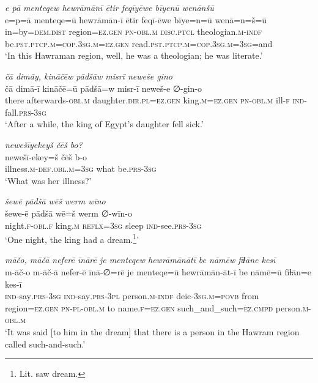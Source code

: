 \ea \label{ZP.23}
\textit{e pā menteqew hewrāmānī ētir feqīyēwe bīyenū wenānšū} \\ 
\gll e=p=ā menteqe=ū hewrāmān-ī ētir feqī-ēwe bīye=n=ū wenā=n=š=ū \\ 
 in=by=\textsc{dem.dist} region\textsc{\textsc{=ez.gen}} \textsc{pn}\textsc{-obl}\textsc{.m} \textsc{disc.ptcl} theologian\textsc{.m}\textsc{-indf} be\textsc{.pst}\textsc{.ptcp}\textsc{.m}\textsc{=cop}\textsc{.3sg}\textsc{.m}\textsc{\textsc{=ez.gen}} read\textsc{.pst}\textsc{.ptcp}\textsc{.m}\textsc{=cop}\textsc{.3sg}\textsc{.m}\textsc{=3sg}=and \\ 
\glt `In this Hawraman region, well, he was a theologian; he was literate.'
\z 
 
\ea \label{ZP.25}
\textit{čā dimāy, kināčēw pādšāw misrī neweše gino} \\ 
\gll čā dimā-ī kināčē=ū pādšā=w misr-ī neweš-e ∅-gin-o \\ 
 there afterwards\textsc{-obl}\textsc{.m} daughter\textsc{.dir}\textsc{.pl}\textsc{\textsc{=ez.gen}} king\textsc{.m}\textsc{\textsc{=ez.gen}} \textsc{pn}\textsc{-obl}\textsc{.m} ill\textsc{-f} \textsc{ind-}fall\textsc{.prs}\textsc{-3sg} \\ 
\glt `After a while, the king of Egypt’s daughter fell sick.'
\z 
 
\ea \label{ZP.27}
\textit{newešīyekeyš čēš bo?} \\ 
\gll newešī-ekey=š čēš b-o \\ 
 illness\textsc{.m}\textsc{-def}\textsc{.obl}\textsc{.m}\textsc{=3sg} what be\textsc{.prs}\textsc{-3sg} \\ 
\glt `What was her illness?'
\z 
 
\ea \label{ZP.30}
\textit{šewē pādšā wēš werm wīno} \\ 
\gll šewe-ē pādšā wē=š werm ∅-wīn-o \\ 
 night\textsc{.f}\textsc{-obl}\textsc{.f} king\textsc{.m} \textsc{reflx}\textsc{=3sg} sleep \textsc{ind-}see\textsc{.prs}\textsc{-3sg} \\ 
\glt `One night, the king had a dream.\footnote{Lit. saw dream.}'
\z 
 
\ea \label{ZP.31}
\textit{māčo, māčā neferē īnārē je menteqew hewrāmānātī be nāmēw fiɫāne kesī} \\ 
\gll m-āč-o m-āč-ā nefer-ē īnā-∅=rē je menteqe=ū hewrāmān-āt-ī be nāmē=ū fiɫān=e kes-ī \\ 
 \textsc{ind-}say\textsc{.prs}\textsc{-3sg} \textsc{ind-}say\textsc{.prs}\textsc{-3pl} person\textsc{.m}\textsc{-indf} deic\textsc{-3sg}\textsc{.m}\textsc{=\textsc{povb}} from region\textsc{\textsc{=ez.gen}} \textsc{pn}\textsc{\textsc{-pl}}\textsc{-obl}\textsc{.m} to name\textsc{.f}\textsc{\textsc{=ez.gen}} such\_and\_such\textsc{=ez}\textsc{.cmpd} person\textsc{.m}\textsc{-obl}\textsc{.m} \\ 
\glt `It was said [to him in the dream] that there is a person in the Hawram region called such-and-such.'
\z 
 
